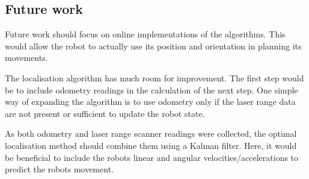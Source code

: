 \subsection{Future work}
Future work should focus on online implementations of the algorithms.
This would allow the robot to actually use its position and orientation in planning its movements.

The localisation algorithm has much room for improvement. The first step would be to
include odometry readings in the calculation of the next step. One simple way of expanding
the algorithm is to use odometry only if the laser range data are not present or sufficient to update the robot state.

As both odometry and laser range scanner readings were collected,
the optimal localisation method should combine them using a Kalman filter.
Here, it would be beneficial to include the robots linear and angular velocities/accelerations
to predict the robots movement.